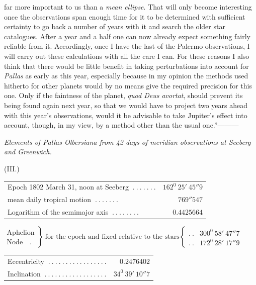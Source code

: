 far more important to us than a \textit{mean ellipse}. That will only become interesting once the observations span enough time for it to be determined with sufficient certainty to go back a number of years with it and search the older star catalogues. After a year and a half one can now already expect something fairly reliable from it. Accordingly, once I have the last of the Palermo
%
observations, I will carry out these calculations with all the care I can. For these reasons I also think that there would be little benefit in taking perturbations into account for \textit{Pallas} as early as this year, especially because in my opinion the methods used hitherto for other planets would by no means give the required precision for this one. Only if the faintness of the planet, \textit{quod Deus avortat}, should prevent its being found again next year, so that we would have to project two years ahead with this year’s observations, would it be advisable to take Jupiter’s effect into account, though, in my view, by a method other than the usual one.”\quad —\quad —\quad —

\begin{center}
\textit{Elements of Pallas Olbersiana from 42 days of meridian observations at Seeberg and Greenwich.}\par\medskip
(III.)\par\medskip
{\small\setlength{\tabcolsep}{2pt}
\begin{tabular}{l r}
Epoch 1802 March 31, noon at Seeberg $\ .\ .\ .\ .\ .\ .\ .$&$162^0\ 25'\ 45''9$\\
mean daily tropical motion $\ .\ .\ .\ .\ .\ .\ .$&$769''547$\\
Logarithm of the semimajor axis $\ .\ .\ .\ .\ .\ .\ .\ .$&$0.4425664$
\end{tabular}
\par\smallskip
$\left.\begin{array}{l}\text{Aphelion}\\\text{Node}\quad .\end{array}\right\}\ \text{for the epoch and fixed relative to the stars}\left\{\begin{array}{lr}
.\ .&300^0\ 58'\ 47''7\\
.\ .&172^0\ 28'\ 17''9
\end{array}\right.$
\par\smallskip
\begin{tabular}{l r}
Eccentricity $\ .\ .\ .\ .\ .\ .\ .\ .\ .\ .\ .\ .\ .\ .\ .\ .\ .$&$0.2476402$\\
Inclination $\ .\ .\ .\ .\ .\ .\ .\ .\ .\ .\ .\ .\ .\ .\ .\ .\ .\ .$&$34^0\ 39'\ 10''7$
\end{tabular}}
\end{center}

